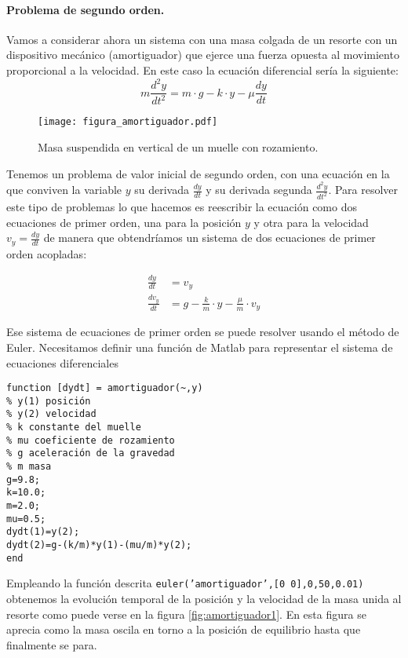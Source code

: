 \paragraph{Problema de segundo orden.} Vamos a considerar ahora un sistema con una masa colgada de un resorte con un dispositivo mecánico (amortiguador) que ejerce una fuerza opuesta al movimiento proporcional a la velocidad. En este caso la ecuación diferencial sería la siguiente:
\begin{equation*}
m\frac{d^2 y}{dt^2}=m\cdot g-k \cdot y-\mu \frac{dy}{dt}
\end{equation*}

\begin{figure}[h]
	\centering
	\texttt{[image: figura\_amortiguador.pdf]}
	\caption{Masa suspendida en vertical de un muelle con rozamiento.}
	\label{fig:masa_suspendida}
\end{figure}

Tenemos un problema de valor inicial de segundo orden, con una ecuación en la que conviven la variable $y$ su derivada $\frac{dy}{dt}$ y su derivada segunda $\frac{d^2y}{dt^2}$. Para resolver este tipo de problemas lo que hacemos es reescribir la ecuación como dos ecuaciones de primer orden, una para la posición $y$ y otra para la velocidad $v_y=\frac{dy}{dt}$ de manera que obtendríamos un sistema de dos ecuaciones de primer orden acopladas:

\begin{align*}
\frac{dy}{dt}&=v_y \\
\frac{dv_y}{dt}&=g-\frac{k}{m}\cdot y - \frac{\mu}{m}\cdot v_y 
\end{align*}

Ese sistema de ecuaciones de primer orden se puede resolver usando el método de Euler. Necesitamos definir una función de Matlab para representar el sistema de ecuaciones diferenciales

\begin{lstlisting}
function [dydt] = amortiguador(~,y)
% y(1) posición
% y(2) velocidad
% k constante del muelle
% mu coeficiente de rozamiento
% g aceleración de la gravedad
% m masa
g=9.8;
k=10.0;
m=2.0;
mu=0.5;
dydt(1)=y(2);
dydt(2)=g-(k/m)*y(1)-(mu/m)*y(2);
end
\end{lstlisting}

Empleando la función descrita \texttt{euler('amortiguador',[0 0],0,50,0.01)} obtenemos la evolución temporal de la posición y la velocidad de la masa unida al resorte como puede verse en la figura \ref{fig:amortiguador1}. En esta figura se aprecia como la masa oscila en torno a la posición de equilibrio hasta que finalmente se para.

